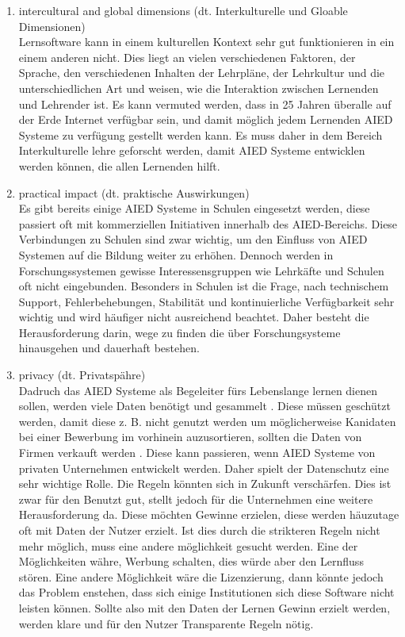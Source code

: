 \begin{enumerate}
    \item intercultural and global dimensions (dt. Interkulturelle und Gloable Dimensionen) \\ 
    Lernsoftware kann in einem kulturellen Kontext sehr gut funktionieren in ein einem anderen nicht. Dies liegt an vielen verschiedenen Faktoren, der Sprache, den verschiedenen Inhalten der Lehrpläne,
    der Lehrkultur und die unterschiedlichen Art und weisen, wie die Interaktion zwischen Lernenden und Lehrender ist. Es kann vermuted werden, dass in 25 Jahren überalle auf der Erde Internet verfügbar sein,
    und damit möglich jedem Lernenden AIED Systeme zu verfügung gestellt werden kann. Es muss daher in dem Bereich Interkulturelle lehre geforscht werden, damit AIED Systeme entwicklen werden können, die allen Lernenden hilft. \cite[S. 9f]{Pinkwart.2016} 
    
    \item practical impact (dt. praktische Auswirkungen) \\
    Es gibt bereits einige AIED Systeme in Schulen eingesetzt werden, diese passiert oft mit kommerziellen Initiativen innerhalb des AIED-Bereichs.
    Diese Verbindungen zu Schulen sind zwar wichtig, um den Einfluss von AIED Systemen auf die Bildung weiter zu erhöhen. Dennoch werden in Forschungssystemen gewisse Interessensgruppen wie Lehrkäfte und Schulen oft nicht eingebunden. 
    Besonders in Schulen ist die Frage, nach technischem Support, Fehlerbehebungen, Stabilität und kontinuierliche Verfügbarkeit sehr wichtig und wird häufiger nicht ausreichend beachtet. 
    Daher besteht die Herausforderung darin, wege zu finden die über Forschungsysteme hinausgehen und dauerhaft bestehen. \cite[S. 10]{Pinkwart.2016}

    \item privacy (dt. Privatspähre) \\
    Dadruch das AIED Systeme als Begeleiter fürs Lebenslange lernen dienen sollen, werden viele Daten benötigt und gesammelt \cite[S. 10]{Pinkwart.2016}. 
    Diese müssen geschützt werden, damit diese z. B. nicht genutzt werden um möglicherweise Kanidaten bei einer Bewerbung im vorhinein auzusortieren, sollten die Daten von Firmen verkauft werden \cite[S. 9f]{Pinkwart.2016}.
    Diese kann passieren, wenn AIED Systeme von privaten Unternehmen entwickelt werden. Daher spielt der Datenschutz eine sehr wichtige Rolle. Die Regeln könnten sich in Zukunft verschärfen.
    Dies ist zwar für den Benutzt gut, stellt jedoch für die Unternehmen eine weitere Herausforderung da. Diese möchten Gewinne erzielen, diese werden häuzutage oft mit Daten der Nutzer erzielt.
    Ist dies durch die strikteren Regeln nicht mehr möglich, muss eine andere möglichkeit gesucht werden. Eine der Möglichkeiten währe, Werbung schalten, dies würde aber den Lernfluss stören.
    Eine andere Möglichkeit wäre die Lizenzierung, dann könnte jedoch das Problem enstehen, dass sich einige Institutionen sich diese Software nicht leisten können.
    Sollte also mit den Daten der Lernen Gewinn erzielt werden, werden klare und für den Nutzer Transparente Regeln nötig. \cite[S. 10f]{Pinkwart.2016}


\end{enumerate}
